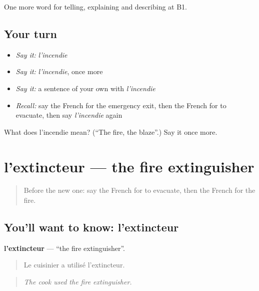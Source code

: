 \begin{grammarlens}[title={What you've built}]
One more word for telling, explaining and describing at B1.
\end{grammarlens}

\subsection*{Your turn}
\begin{itemize}
\raggedright
  \item \emph{Say it:} \emph{l'incendie}
  \item \emph{Say it:} \emph{l'incendie}, once more
  \item \emph{Say it:} a sentence of your own with \emph{l'incendie}
  \item \emph{Recall:} say the French for the emergency exit, then the French for to evacuate, then say \emph{l'incendie} again
\end{itemize}

\begin{tcolorbox}[breakable,colback=teal!4,colframe=teal!35!black,title={Before you move on}]
What does l'incendie mean? (\textquotedblleft{}The fire, the blaze\textquotedblright{}.) Say it once more.
\end{tcolorbox}
\section[l'extincteur]{l'extincteur — the fire extinguisher}

\label{lesson:FR-C302-extincteur}



\begin{quote}
Before the new one: say the French for to evacuate, then the French for the fire.
\end{quote}

\subsection*{You'll want to know: l'extincteur}
\textbf{l'extincteur} — \textquotedblleft{}the fire extinguisher\textquotedblright{}.

\begin{quote}
Le cuisinier a utilisé l'extincteur.
\end{quote}

\begin{quote}
\emph{The cook used the fire extinguisher.}
\end{quote}


